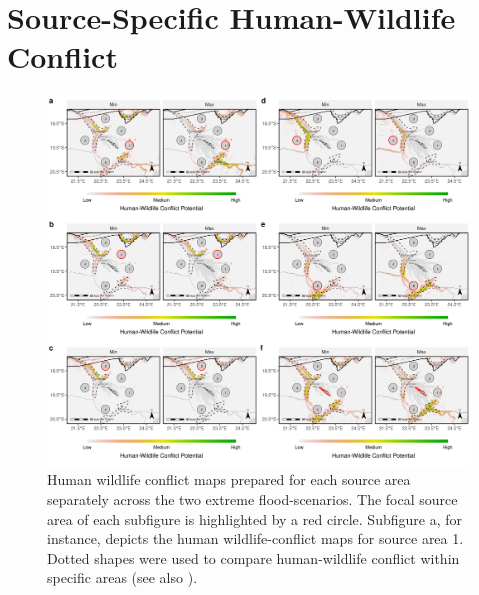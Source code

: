\documentclass[../FinalThesis.tex]{subfiles}
\begin{document}
\section{Source-Specific Human-Wildlife Conflict}
\begin{figure}[!ht]
  \begin{center}
  \includegraphics[width = \textwidth]{Figures/HumanWildlifeConflictIndividual.png}
  \caption{Human wildlife conflict maps prepared for each source area separately
  across the two extreme flood-scenarios. The focal source area of each
  subfigure is highlighted by a red circle. Subfigure a, for instance, depicts
  the human wildlife-conflict maps for source area 1. Dotted shapes were used to
  compare human-wildlife conflict within specific areas (see also
  ).}
  \label{HWCInd}
  \end{center}
\end{figure}

\newpage
\end{document}
